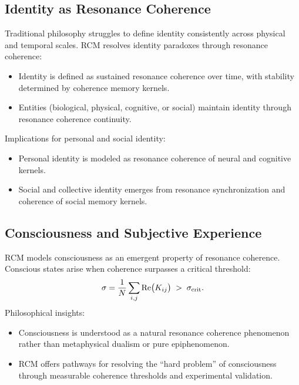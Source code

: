 \subsection{Identity as Resonance Coherence}
Traditional philosophy struggles to define identity consistently across physical and temporal scales. RCM resolves identity paradoxes through resonance coherence:
\begin{itemize}
  \item Identity is defined as sustained resonance coherence over time, with stability determined by coherence memory kernels.
  \item Entities (biological, physical, cognitive, or social) maintain identity through resonance coherence continuity.
\end{itemize}
Implications for personal and social identity:
\begin{itemize}
  \item Personal identity is modeled as resonance coherence of neural and cognitive kernels.
  \item Social and collective identity emerges from resonance synchronization and coherence of social memory kernels.
\end{itemize}

\subsection{Consciousness and Subjective Experience}
RCM models consciousness as an emergent property of resonance coherence. Conscious states arise when coherence surpasses a critical threshold:
\[
\sigma = \frac{1}{N}\sum_{i,j}\Re\bigl(K_{ij}\bigr) \;>\; \sigma_{\rm crit}.
\]
Philosophical insights:
\begin{itemize}
  \item Consciousness is understood as a natural resonance coherence phenomenon rather than metaphysical dualism or pure epiphenomenon.
  \item RCM offers pathways for resolving the “hard problem” of consciousness through measurable coherence thresholds and experimental validation.
\end{itemize}


